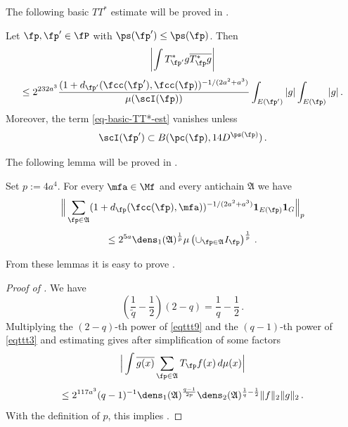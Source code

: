 The following basic $TT^*$ estimate will be proved in .
\begin{lemma}
    \label{tile-correlation}
    \leanok
    Let $\fp, \fp'\in \fP$ with
    $\ps({\fp'})\leq \ps({\fp})$.
    Then
    \begin{equation}
        \label{eq-basic-TT*-est}
        \left|\int T^*_{\fp'}g\overline{T^*_{\fp}g}\right|
    \end{equation}
    \begin{equation}
        \le 2^{232a^3}\frac{(1+d_{\fp'}(\fcc(\fp'), \fcc(\fp))^{-1/(2a^2+a^3)}}{\mu(\scI(\fp))}\int_{E(\fp')}|g|\int_{E(\fp)}|g|\,.
    \end{equation}
    Moreover, the term \eqref{eq-basic-TT*-est} vanishes unless
    \begin{equation}
        \scI(\fp') \subset B(\pc(\fp), 14D^{\ps(\fp)})\, .
    \end{equation}
\end{lemma}

The following lemma will be proved in .
\begin{lemma}
    \label{antichain-tile-count}
\leanok
{}
    Set $p:=4a^4$. For every $\mfa\in\Mf$ and every antichain $\mathfrak{A}$ we have
    \begin{equation}
        \label{eq-antichain-Lp}
        \Big\|\sum_{\fp\in\mathfrak{A}}(1+d_{\fp}(\fcc(\fp), \mfa))^{-1/(2a^2+a^3)}\mathbf{1}_{E(\fp)}\mathbf{1}_G\Big\|_{p}
    \end{equation}
    \begin{equation}
        \le
        2^{5a}\dens_1(\mathfrak{A})^{\frac 1p}\mu\left(\cup_{\fp\in\mathfrak{A}}I_{\fp}\right)^{\frac 1p}\, .
    \end{equation}
\end{lemma}

From these lemmas it is easy to prove .
\begin{proof}[Proof of ]
\leanok
We have
\begin{equation}
    \left(\frac 1{\tilde{q}} -\frac 12\right) (2-q)= \frac 1q -\frac 12\,.
\end{equation}
Multiplying the $(2-q)$-th power of \eqref{eqttt9} and the $(q-1)$-th power of \eqref{eqttt3}
and estimating gives after simplification of some factors
\begin{equation}\label{eqttt8}
    \Big|\int \overline{g(x)} \sum_{\fp \in \mathfrak{A}} T_{\fp} f(x)\, d\mu(x)\Big|
\end{equation}
 \begin{equation}
    \le 2^{117a^3}(q-1)^{-1} \dens_1(\mathfrak{A})^{\frac {q-1}{2p}}\dens_2(\mathfrak{A})^{\frac 1{q}-\frac 12} \|f\|_2\|g\|_2\, .
\end{equation}
With the definition of $p$, this implies
.
\end{proof}


